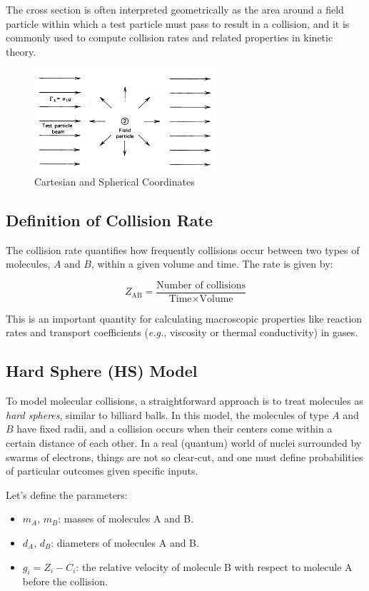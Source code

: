 \documentclass{article}
\begin{document}
The cross section is often interpreted geometrically as the area around a field particle within which a test particle must pass to result in a collision, and it is commonly used to compute collision rates and related properties in kinetic theory.

\begin{figure}
        \centering
        \includegraphics[width=0.6\textwidth]{crossSec.png}
        \caption{Cartesian and Spherical Coordinates}
    \end{figure}

\subsection{Definition of Collision Rate}

The collision rate quantifies how frequently collisions occur between two types of molecules, \( A \) and \( B \), within a given volume and time. The rate is given by:

\[
Z_{\text{AB}} = \frac{\text{Number of collisions}}{\text{Time} \times \text{Volume}}
\]

This is an important quantity for calculating macroscopic properties like reaction rates and transport coefficients (\emph{e.g.}, viscosity or thermal conductivity) in gases.

\subsection{Hard Sphere (HS) Model}

To model molecular collisions, a straightforward approach is to treat molecules as \emph{hard spheres}, similar to billiard balls. In this model, the molecules of type \( A \) and \( B \) have fixed radii, and a collision occurs when their centers come within a certain distance of each other. In a real (quantum) world of nuclei surrounded by swarms of electrons, things are not so clear-cut, and one must define probabilities of particular outcomes given specific inputs.

Let’s define the parameters:
\begin{itemize}
    \item \( m_A \), \( m_B \): masses of molecules A and B.
    \item \( d_A \), \( d_B \): diameters of molecules A and B.
    \item \( g_i = Z_i - C_i \): the relative velocity of molecule B with respect to molecule A before the collision.
\end{itemize}
\end{document}
